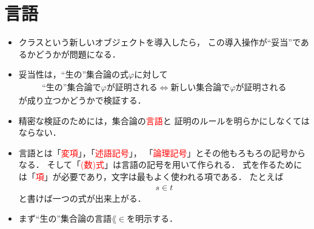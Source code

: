 \begin{comment}
		\item 島内では$\varepsilon$項，ブルバキでは$\tau$項．
			
		\item しかし式$\varphi(x)$に対して$\varepsilon x \varphi(x)$なるオブジェクトを項とすると
			\textcolor{red}{項と式の定義が入れ子になってしまう}．
			
\newpage
		\item $\varepsilon$項を活用しつつ入れ子の問題を解消し，
			またクラスの自然な導入により具体的で直観的な集合論を構築．
		
		\item この言語の拡張がZFCの単純な保存拡大ではないのでZFCと厳密にどう関係しているかは未だ不明
			(ZFCで示せることは示せるはず．逆に本稿の集合論で示せることがZFCから示せるかは不明)．
	\end{itemize}
	\end{comment}
	
\section{言語}
	\begin{itemize}
	\setlength{\itemsep}{10pt}
		\item クラスという新しいオブジェクトを導入したら，
			この導入操作が``妥当''であるかどうかが問題になる．
		
		\item 妥当性は，``生の''集合論の式$\varphi$に対して
			\begin{align}
				\mbox{``生の''集合論で$\varphi$が証明される}
				\Longleftrightarrow
				\mbox{新しい集合論で$\varphi$が証明される}
			\end{align}
			が成り立つかどうかで検証する．
		
		\item 精密な検証のためには，集合論の\textcolor{red}{言語}と
			証明のルールを明らかにしなくてはならない．
		
		\item 言語とは「\textcolor{red}{変項}」，「\textcolor{red}{述語記号}」，
			「\textcolor{red}{論理記号}」とその他もろもろの記号からなる．
			そして「\textcolor{red}{(数)式}」は言語の記号を用いて作られる．
			式を作るためには「\textcolor{red}{項}」が必要であり，文字は最もよく使われる項である．
			たとえば
			\begin{align}
				s \in t
			\end{align}
			と書けば一つの式が出来上がる．
		
		\item まず``生の''集合論の言語$\lang{\in}$を明示する．
	\end{itemize}
		
